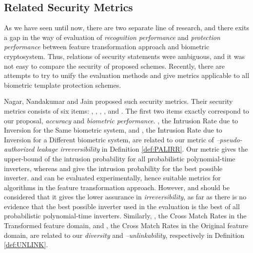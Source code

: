 \subsection{Related Security Metrics}
As we have seen until now, there are two separate line of research, and there exits a gap in the way of evaluation of  {\it recognition performance} and {\it protection performance} between feature transformation approach and biometric cryptosystem. 
Thus, relations of security statements were ambiguous, and it was not easy to compare the security of proposed schemes. Recently, there are attempts to try to unify the evaluation methods and give metrics applicable to all biometric template protection schemes. 

Nagar, Nandakumar and Jain\cite{Nagar:2010tg} proposed such security metrics. Their security metrics consists of six items: , , , ,  and . The first two items exactly correspond to our proposal, {\it accuracy} and {\it biometric performance}.  , the Intrusion Rate due to Inversion for the Same biometric system, and , the Intrusion Rate due to Inversion for a Different biometric system, are related to our metric of {\it --pseudo-authorized leakage irreversibility} in Definition \ref{def:PALIRR}. Our metric gives the upper-bound of the intrusion probability for all probabilistic polynomial-time inverters, whereas  and  give the intrusion probability for the best possible inverter.  and  can be evaluated experimentally, hence suitable metrics for algorithms in the feature transformation approach. However,  and  should be considered that it gives the lower assurance in {\it irreversibility}, as far as there is no evidence that the best possible inverter used in the evaluation is the best of all probabilistic polynomial-time inverters. Similarly,  , the Cross Match Rates in the Transformed feature domain, and , the Cross Match Rates in the Original feature domain, are related to our {\it diversity} and {\it --unlinkability}, respectively in Definition \ref{def:UNLINK}. 

